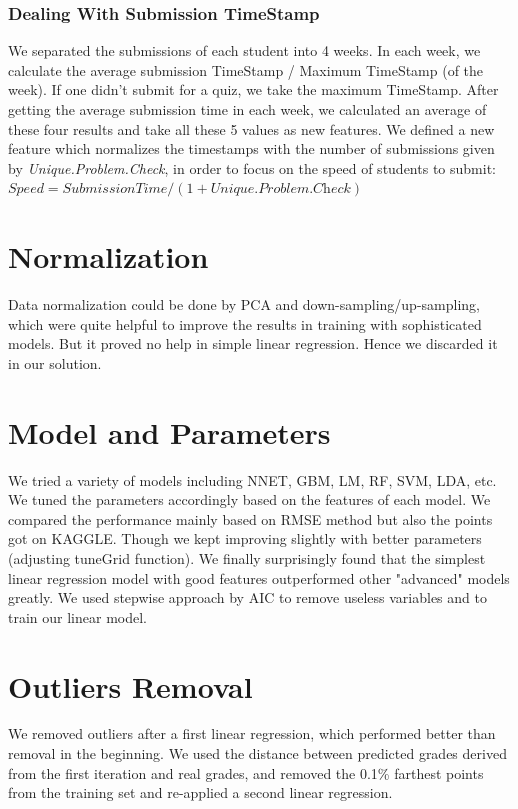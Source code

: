 \documentclass{article}
\begin{document}
\subsubsection{Dealing With Submission TimeStamp}
We separated the submissions of each student into 4 weeks. In each week, we calculate the average submission TimeStamp / Maximum TimeStamp (of the week). If one didn't submit for a quiz, we take the maximum TimeStamp.
After getting the average submission time in each week, we calculated an average of these four results and take all these 5 values as new features.
We defined a new feature which normalizes the timestamps with the number of submissions given by \textit{Unique.Problem.Check}, in order to focus on the speed of students to submit:\\
$\textit{Speed} = \textit{SubmissionTime}/(1+\textit{Unique.Problem.Check})$\\

\section{Normalization}
Data normalization could be done by PCA and down-sampling/up-sampling, which were quite helpful to improve the results in training with sophisticated models. But it proved no help in simple linear regression. Hence we discarded it in our solution. 

\section{Model and Parameters}
We tried a variety of models including NNET, GBM, LM, RF, SVM, LDA, etc. We tuned the parameters accordingly based on the features of each model. We compared the performance mainly based on RMSE method but also the points got on KAGGLE. Though we kept improving slightly with better parameters (adjusting tuneGrid function). We finally surprisingly found that the simplest linear regression model with good features outperformed other "advanced" models greatly. We used stepwise approach by AIC to remove useless variables and to train our linear model.  

\section{Outliers Removal} 
We removed outliers after a first linear regression, which performed better than removal in the beginning. We used the distance between predicted grades derived from the first iteration and real grades, and removed the 0.1\% 
farthest points from the training set and re-applied a second linear regression.
\end{document}
